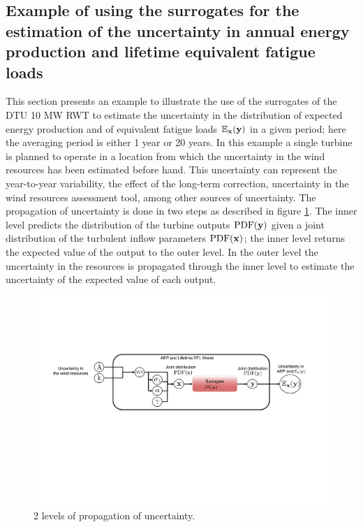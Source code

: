 \documentclass[preprint,12pt]{elsarticle}
\begin{document}

\subsection{Example of using the surrogates for the estimation of the  uncertainty in annual energy production and lifetime equivalent fatigue loads}
\label{subsec_Final_EX}

This section presents an example to illustrate the use of the surrogates of the DTU 10 MW RWT to estimate the uncertainty in the distribution of expected energy production and of equivalent fatigue loads $\mathbb{E}_{\mathbf{x}}(\mathbf{y})$ in a given period; here the averaging period is either 1 year or 20 years. In this example a single turbine is planned to operate in a location from which the uncertainty in the wind resources has been estimated before hand. This uncertainty can represent the year-to-year variability, the effect of the long-term correction, uncertainty in the wind resources assessment tool, among other sources of uncertainty. The propagation of uncertainty is done in two steps as described in figure \ref{fig_2_UQ}. The inner level predicts the distribution of the turbine outputs $\mathrm{PDF}(\mathbf{y})$ given a joint distribution of the turbulent inflow parameters $\mathrm{PDF}(\mathbf{x})$; the inner level returns the expected value of the output to the outer level. In the outer level the uncertainty in the resources is propagated through the inner level to estimate the uncertainty of the expected value of each output.

\begin{figure}[h!]
\begin{centering}
\includegraphics[width=0.9\linewidth]{Figures/2level_propagation.pdf}
\caption{2 levels of propagation of uncertainty.}
\label{fig_2_UQ}
\end{centering}
\end{figure}
\end{document}
